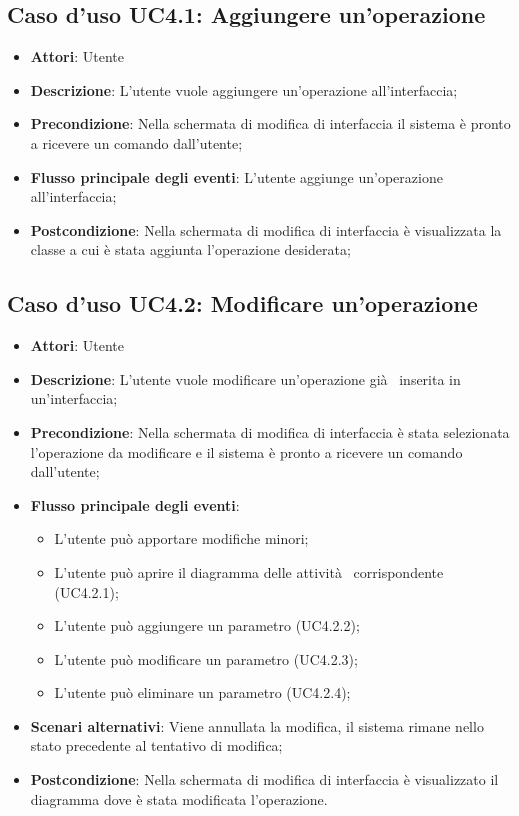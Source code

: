 \documentclass[../AnalisiDeiRequisiti.tex]{subfiles}
\begin{document}
			\subsection{Caso d'uso UC4.1: Aggiungere un'operazione}
			\begin{itemize}
				\item \textbf{Attori}: Utente
				\item \textbf{Descrizione}: L'utente vuole aggiungere un'operazione all'interfaccia;
				\item \textbf{Precondizione}: Nella schermata di modifica di interfaccia il sistema è pronto a ricevere un comando dall'utente;
				\item \textbf{Flusso principale degli eventi}: L'utente aggiunge un'operazione all'interfaccia;
				\item \textbf{Postcondizione}: Nella schermata di modifica di interfaccia è visualizzata la classe a cui è stata aggiunta l'operazione desiderata;
			\end{itemize}
			\subsection{Caso d'uso UC4.2: Modificare un'operazione}
			\begin{itemize}
				\item \textbf{Attori}: Utente
				\item \textbf{Descrizione}: L'utente vuole modificare un'operazione già  inserita in un'interfaccia;
				\item \textbf{Precondizione}: Nella schermata di modifica di interfaccia è stata selezionata l'operazione da modificare e il sistema è pronto a ricevere un comando dall'utente;
				\item \textbf{Flusso principale degli eventi}: \begin{itemize}
					\item L'utente può apportare modifiche minori;
					\item L'utente può aprire il diagramma delle attività  corrispondente (UC4.2.1);
					\item L'utente può aggiungere un parametro (UC4.2.2);
					\item L'utente può modificare un parametro (UC4.2.3);
					\item L'utente può eliminare un parametro (UC4.2.4);
				\end{itemize}
				\item \textbf{Scenari alternativi}: Viene annullata la modifica, il sistema rimane nello stato precedente al tentativo di modifica;
				\item \textbf{Postcondizione}: Nella schermata di modifica di interfaccia è visualizzato il diagramma dove è stata modificata l'operazione.
			\end{itemize}
\end{document}
